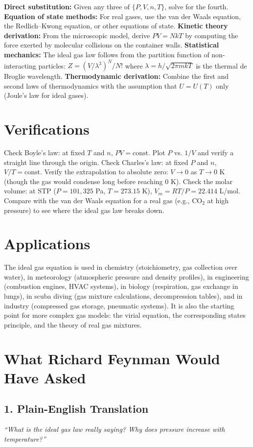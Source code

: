 \documentclass[11pt,openright]{book}
\begin{document}
\textbf{Direct substitution:} Given any three of $\{P, V, n, T\}$, solve for the fourth. \textbf{Equation of state methods:} For real gases, use the van der Waals equation, the Redlich--Kwong equation, or other equations of state. \textbf{Kinetic theory derivation:} From the microscopic model, derive $PV = NkT$ by computing the force exerted by molecular collisions on the container walls. \textbf{Statistical mechanics:} The ideal gas law follows from the partition function of non-interacting particles: $Z = (V/\lambda^3)^N/N!$ where $\lambda = h/\sqrt{2\pi mkT}$ is the thermal de Broglie wavelength. \textbf{Thermodynamic derivation:} Combine the first and second laws of thermodynamics with the assumption that $U = U(T)$ only (Joule's law for ideal gases).
\section*{Verifications}

Check Boyle's law: at fixed $T$ and $n$, $PV = \text{const}$. Plot $P$ vs. $1/V$ and verify a straight line through the origin. Check Charles's law: at fixed $P$ and $n$, $V/T = \text{const}$. Verify the extrapolation to absolute zero: $V \to 0$ as $T \to 0$ K (though the gas would condense long before reaching 0 K). Check the molar volume: at STP ($P = 101{,}325$ Pa, $T = 273.15$ K), $V_m = RT/P = 22.414$ L/mol. Compare with the van der Waals equation for a real gas (e.g., CO$_2$ at high pressure) to see where the ideal gas law breaks down.
\section*{Applications}

The ideal gas equation is used in chemistry (stoichiometry, gas collection over water), in meteorology (atmospheric pressure and density profiles), in engineering (combustion engines, HVAC systems), in biology (respiration, gas exchange in lungs), in scuba diving (gas mixture calculations, decompression tables), and in industry (compressed gas storage, pneumatic systems). It is also the starting point for more complex gas models: the virial equation, the corresponding states principle, and the theory of real gas mixtures.
\section*{What Richard Feynman Would Have Asked}

\subsection*{1. Plain-English Translation}
\textit{``What is the ideal gas law really saying? Why does pressure increase with temperature?''}
\end{document}

